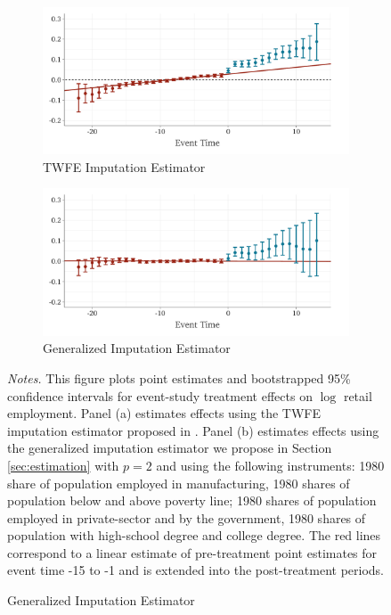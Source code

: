 \documentclass[12pt]{article}
\begin{document}
\begin{figure}
\caption{Effect of Walmart on County $\log$ Retail Employment}
\label{fig:walmart_retail}

\begin{center}
\begin{subfigure}[b]{0.75\textwidth}
  \caption{TWFE Imputation Estimator}
  \begin{adjustbox}{width=\textwidth, center}
    \includegraphics{../figures/plot_did2s_retail.pdf}
  \end{adjustbox}
\end{subfigure}
\end{center}
\begin{center}
\begin{subfigure}[b]{0.75\textwidth}
  \caption{Generalized Imputation Estimator}
  \begin{adjustbox}{width=\textwidth, center}
    \includegraphics{../figures/plot_qld_retail.pdf}
  \end{adjustbox}
\end{subfigure}
\end{center}

{\footnotesize \emph{Notes.} This figure plots point estimates and bootstrapped 95\%  confidence intervals for event-study treatment effects on $\log$ retail employment. Panel (a) estimates effects using the TWFE imputation estimator proposed in \citet{Borusyak_Jaravel_Spiess_2021}. Panel (b) estimates effects using the generalized imputation estimator we propose in Section \ref{sec:estimation} with $p = 2$ and using the following instruments: 1980 share of population employed in manufacturing, 1980 shares of population below and above poverty line; 1980 shares of population employed in private-sector and by the government, 1980 shares of population with high-school degree and college degree. The red lines correspond to a linear estimate of pre-treatment point estimates for event time -15 to -1 and is extended into the post-treatment periods.}
\end{figure}
\end{document}
